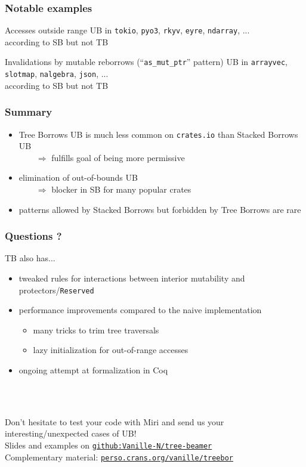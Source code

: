 \begin{frame}
    \frametitle{Notable examples}
    \begin{block}{Accesses outside range}
        UB in \texttt{tokio}, \texttt{pyo3}, \texttt{rkyv}, \texttt{eyre}, \texttt{ndarray}, ...\\
        according to SB but not TB
    \end{block}
    \begin{block}{Invalidations by mutable reborrows (``\texttt{as\_mut\_ptr}'' pattern)}
        UB in \texttt{arrayvec}, \texttt{slotmap}, \texttt{nalgebra}, \texttt{json}, ...\\
        according to SB but not TB
    \end{block}
\end{frame}

\begin{frame}
    \frametitle{Summary}
    \begin{itemize}
        \item Tree Borrows UB is much less common on \texttt{crates.io} than Stacked Borrows UB\\
            \(\qquad\Rightarrow\) fulfills goal of being more permissive
        \item elimination of out-of-bounds UB\\
            \(\qquad\Rightarrow\) blocker in SB for many popular crates
        \item patterns allowed by Stacked Borrows but forbidden by Tree Borrows are rare
    \end{itemize}
\end{frame}

\begin{frame}
    \frametitle{Questions ?}

    TB also has...
    \begin{itemize}
        \item tweaked rules for interactions between interior mutability and protectors/\texttt{Reserved}
        \item performance improvements compared to the naive implementation
            \begin{itemize}
                \item many tricks to trim tree traversals
                \item lazy initialization for out-of-range accesses
            \end{itemize}
        \item ongoing attempt at formalization in Coq
    \end{itemize}~\\~\\
    \vfill

    Don't hesitate to test your code with Miri and send us your interesting/unexpected cases of UB!\\
    Slides and examples on \href{https://github.com/Vanille-N/tree-beamer}{\texttt{github:Vanille-N/tree-beamer}}\\
    Complementary material: \href{https://perso.crans.org/vanille/treebor}{\texttt{perso.crans.org/vanille/treebor}}\\
\end{frame}
